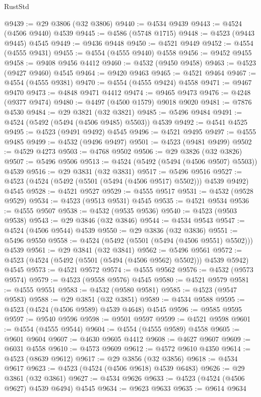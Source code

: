 \begin{lexlean}{RustStd}
\begin{coremodule}
@9439 := @29 @3806 (@32 @3806)
@9440 := @4534 @9439
@9443 := @4524 (@4506 @9440) @4539
@9445 := @4586 (@5748 @1715)
@9448 := @4523 (@9443 @9445) @4545
@9449 := @9436 @9448
@9450 := @4521 @9449
@9452 := @4554 (@4555 @9431)
@9455 := @4554 (@4555 @9440) @4558
@9456 := @9452 @9455
@9458 := @9408 @9456 @4412
@9460 := @4532 (@9450 @9458)
@9463 := @4523 (@9427 @9460) @4545
@9464 := @9420 @9463
@9465 := @4521 @9464
@9467 := @4554 (@4555 @9381)
@9470 := @4554 (@4555 @9424) @4558
@9471 := @9467 @9470
@9473 := @4848 @9471 @4412
@9474 := @9465 @9473
@9476 := @4248 (@9377 @9474)
@9480 := @4497 (@4500 @1579) @9018 @9020
@9481 := @7876 @4530
@9484 := @29 @3821 (@32 @3821)
@9485 := @5496 @9484
@9491 := @4524 (@5492 (@5494 (@4506 @9485) @5503)) @4539
@9492 := @4541 @4525
@9495 := @4523 (@9491 @9492) @4545
@9496 := @4521 @9495
@9497 := @4555 @9485
@9499 := @4532 (@9496 @9497)
@9501 := @4523 (@9481 @9499)
@9502 := @4529 @4273
@9503 := @4768 @9502
@9506 := @29 @3826 (@32 @3826)
@9507 := @5496 @9506
@9513 := @4524 (@5492 (@5494 (@4506 @9507) @5503)) @4539
@9516 := @29 @3831 (@32 @3831)
@9517 := @5496 @9516
@9527 := @4523 (@4524 (@5492 (@5501 (@5494 (@4506 @9517) @5502))) @4539 @9492) @4545
@9528 := @4521 @9527
@9529 := @4555 @9517
@9531 := @4532 (@9528 @9529)
@9534 := @4523 (@9513 @9531) @4545
@9535 := @4521 @9534
@9536 := @4555 @9507
@9538 := @4532 (@9535 @9536)
@9540 := @4523 (@9503 @9538)
@9543 := @29 @3846 (@32 @3846)
@9544 := @4534 @9543
@9547 := @4524 (@4506 @9544) @4539
@9550 := @29 @3836 (@32 @3836)
@9551 := @5496 @9550
@9558 := @4524 (@5492 (@5501 (@5494 (@4506 @9551) @5502))) @4539
@9561 := @29 @3841 (@32 @3841)
@9562 := @5496 @9561
@9572 := @4523 (@4524 (@5492 (@5501 (@5494 (@4506 @9562) @5502))) @4539 @5942) @4545
@9573 := @4521 @9572
@9574 := @4555 @9562
@9576 := @4532 (@9573 @9574)
@9579 := @4523 (@9558 @9576) @4545
@9580 := @4521 @9579
@9581 := @4555 @9551
@9583 := @4532 (@9580 @9581)
@9585 := @4523 (@9547 @9583)
@9588 := @29 @3851 (@32 @3851)
@9589 := @4534 @9588
@9595 := @4523 (@4524 (@4506 @9589) @4539 @4648) @4545
@9596 := @9585 @9595
@9597 := @9540 @9596
@9598 := @9501 @9597
@9599 := @4521 @9598
@9601 := @4554 (@4555 @9544)
@9604 := @4554 (@4555 @9589) @4558
@9605 := @9601 @9604
@9607 := @4630 @9605 @4412
@9608 := @4627 @9607
@9609 := @6031 @4558
@9610 := @4573 @9609
@9612 := @4572 @9610 @4350
@9614 := @4523 (@8639 @9612)
@9617 := @29 @3856 (@32 @3856)
@9618 := @4534 @9617
@9623 := @4523 (@4524 (@4506 @9618) @4539 @6483)
@9626 := @29 @3861 (@32 @3861)
@9627 := @4534 @9626
@9633 := @4523 (@4524 (@4506 @9627) @4539 @6494) @4545
@9634 := @9623 @9633
@9635 := @9614 @9634

\end{coremodule}
\end{lexlean}
